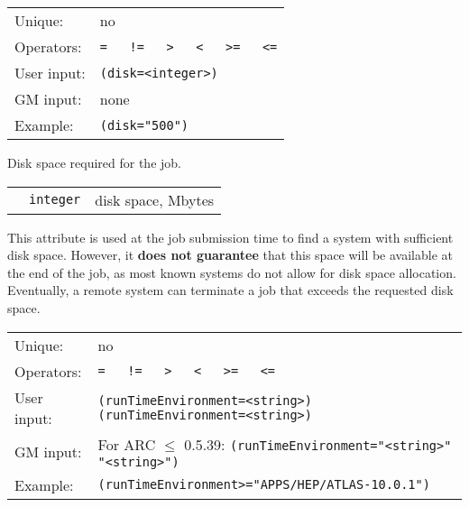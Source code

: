   \hspace*{0.5cm}
  \begin{shaded}
  \end{shaded}
  \begin{tabular}{lp{13cm}}
    Unique:&no\\
    Operators:&\verb#=   !=   >   <   >=   <=#\\
    User input:&\verb#(disk=<integer>)#\\
    GM input:&none\\
    Example:&\verb#(disk="500")#\\
  \end{tabular}

  Disk space required for the job.

  \begin{tabular}{llp{10cm}}
    \hspace*{1cm}&\texttt{integer}  & disk space, Mbytes\\
  \end{tabular}

  \begin{framed}
    This attribute is used at the job submission time to find a system
    with sufficient disk space. However, it \textbf{does not
    guarantee} that this space will be available at the end of the
    job, as most known systems do not allow for disk space
    allocation. Eventually, a remote system can terminate a job that
    exceeds the requested disk space.
  \end{framed}

  \hspace*{0.5cm}
  \begin{shaded}
  \end{shaded}
  \begin{tabular}{lp{13cm}}
    Unique:&no\\
    Operators:&\verb#=   !=   >   <   >=   <=#\\
    User input:&\verb#(runTimeEnvironment=<string>)(runTimeEnvironment=<string>)#\\
    GM input:&For ARC $\leq$ 0.5.39: \verb#(runTimeEnvironment="<string>" "<string>")#\\
    Example:&\verb#(runTimeEnvironment>="APPS/HEP/ATLAS-10.0.1")#\\
  \end{tabular}

